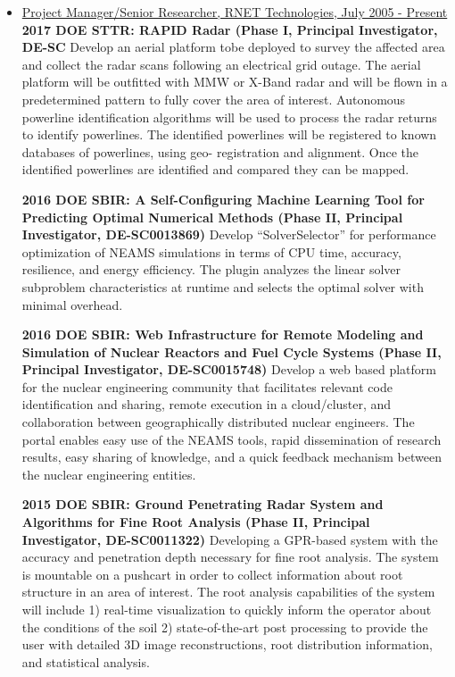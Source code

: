  \begin{itemize}
 	\setlength{\itemsep}{0.2pt}
 	
 	\item\underline{Project Manager/Senior Researcher, RNET Technologies, July 2005 - Present}\\
 	
 	\textbf{2017 DOE STTR: RAPID Radar (Phase I, Principal Investigator, DE-SC} Develop an aerial platform tobe deployed to survey the affected area and collect the radar scans following an electrical grid outage. The aerial platform will be outfitted with MMW or X-Band radar and will be flown in a predetermined pattern to fully cover the area of interest. Autonomous powerline identification algorithms will be used to process the radar returns to identify powerlines. The identified powerlines will be registered to known databases of powerlines, using geo- registration and alignment. Once the identified powerlines are identified and compared they can be mapped.
	
 	\textbf{2016 DOE SBIR: A Self-Configuring Machine Learning
 	Tool for Predicting Optimal Numerical Methods (Phase II,
 	Principal Investigator, DE-SC0013869)} Develop
 	``SolverSelector'' for performance optimization of NEAMS
 	simulations in terms of CPU time, accuracy, resilience, and
 	energy efficiency. The plugin analyzes the linear solver
 	subproblem characteristics at runtime and selects the optimal
 	solver with minimal overhead.

 	\textbf{2016 DOE SBIR: Web Infrastructure for Remote Modeling
 	and Simulation of Nuclear Reactors and Fuel Cycle Systems
 	(Phase II, Principal Investigator, DE-SC0015748)} Develop a web
 	based platform for the nuclear engineering community that
 	facilitates relevant code identification and sharing, remote
 	execution in a cloud/cluster, and collaboration between
 	geographically distributed nuclear engineers. The portal
 	enables easy use of the NEAMS tools, rapid dissemination of
 	research results, easy sharing of knowledge, and a quick
 	feedback mechanism between the nuclear engineering entities.

 	\textbf{2015 DOE SBIR: Ground Penetrating Radar System and
 	Algorithms for Fine Root Analysis (Phase II, Principal Investigator,
 	DE-SC0011322)}
 	Developing a GPR-based system with the accuracy and
 	penetration depth necessary for fine root analysis. The system is
 	mountable on a pushcart in order to collect information about root
 	structure in an area of interest. The root analysis capabilities of
 	the system will include 1) real-time visualization to quickly inform
 	the operator about the conditions of the soil 2) state-of-the-art post
 	processing to provide the user with detailed 3D image reconstructions,
 	root distribution information, and statistical analysis.
 	

\end{itemize}
